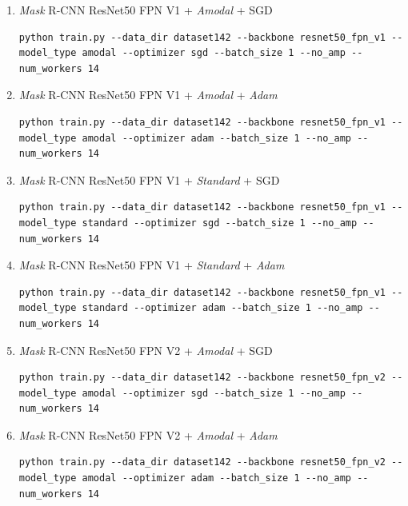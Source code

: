\begin{enumerate}  %
\item \textit{Mask} R-CNN ResNet50 FPN V1 + \textit{Amodal} + SGD \smallskip
\begin{lstlisting}
python train.py --data_dir dataset142 --backbone resnet50_fpn_v1 --model_type amodal --optimizer sgd --batch_size 1 --no_amp --num_workers 14 
\end{lstlisting}
\medskip

\item \textit{Mask} R-CNN ResNet50 FPN V1 + \textit{Amodal} + \textit{Adam} \smallskip
\begin{lstlisting}
python train.py --data_dir dataset142 --backbone resnet50_fpn_v1 --model_type amodal --optimizer adam --batch_size 1 --no_amp --num_workers 14 
\end{lstlisting}
\medskip

\item \textit{Mask} R-CNN ResNet50 FPN V1 + \textit{Standard} + SGD \smallskip
\begin{lstlisting}
python train.py --data_dir dataset142 --backbone resnet50_fpn_v1 --model_type standard --optimizer sgd --batch_size 1 --no_amp --num_workers 14 
\end{lstlisting}
\medskip

\item \textit{Mask} R-CNN ResNet50 FPN V1 + \textit{Standard} + \textit{Adam} \smallskip
\begin{lstlisting}
python train.py --data_dir dataset142 --backbone resnet50_fpn_v1 --model_type standard --optimizer adam --batch_size 1 --no_amp --num_workers 14 
\end{lstlisting}
\medskip

\item \textit{Mask} R-CNN ResNet50 FPN V2 + \textit{Amodal} + SGD \smallskip
\begin{lstlisting}
python train.py --data_dir dataset142 --backbone resnet50_fpn_v2 --model_type amodal --optimizer sgd --batch_size 1 --no_amp --num_workers 14 
\end{lstlisting}
\medskip

\item \textit{Mask} R-CNN ResNet50 FPN V2 + \textit{Amodal} + \textit{Adam} \smallskip
\begin{lstlisting}
python train.py --data_dir dataset142 --backbone resnet50_fpn_v2 --model_type amodal --optimizer adam --batch_size 1 --no_amp --num_workers 14 
\end{lstlisting}
\medskip


\end{enumerate}
